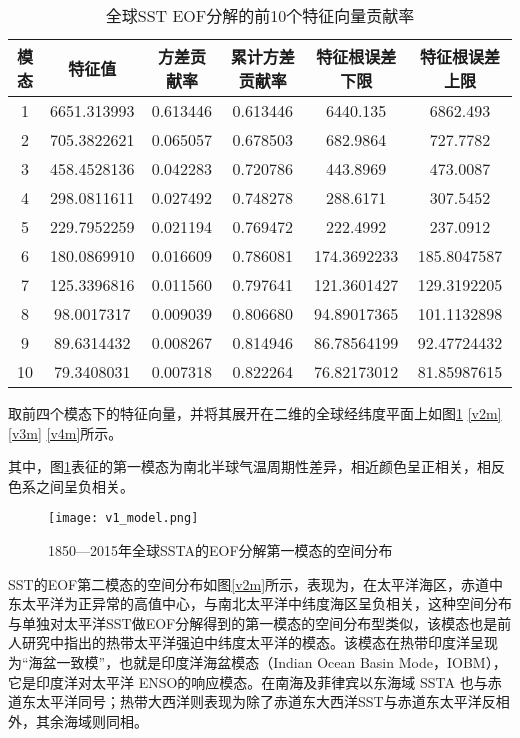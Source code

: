 \documentclass[bwprint]{gmcmthesis}
\begin{document}
\begin{table}[ht]
\centering
\caption{全球SST EOF分解的前10个特征向量贡献率}\label{SST_EOF}%
\begin{tabular}{cccccc}
\toprule  %
模态& 特征值& 方差贡献率& 累计方差贡献率& 特征根误差下限& 特征根误差上限\\
\midrule  %
1& 6651.313993& 0.613446& 0.613446& 6440.135& 6862.493\\
2& 705.3822621& 0.065057& 0.678503& 682.9864& 727.7782\\
3& 458.4528136& 0.042283& 0.720786& 443.8969& 473.0087\\
4& 298.0811611& 0.027492& 0.748278& 288.6171& 307.5452\\
5& 229.7952259& 0.021194& 0.769472& 222.4992& 237.0912\\
6& 180.0869910& 0.016609& 0.786081& 174.3692233& 185.8047587\\
7& 125.3396816& 0.011560& 0.797641& 121.3601427& 129.3192205\\
8& 98.0017317& 	0.009039& 0.806680& 94.89017365& 101.1132898\\
9& 89.6314432& 	0.008267& 0.814946& 86.78564199& 92.47724432\\
10& 79.3408031& 0.007318& 0.822264& 76.82173012& 81.85987615\\
\bottomrule %
\end{tabular}
\end{table}

取前四个模态下的特征向量，并将其展开在二维的全球经纬度平面上如图\ref{v1m} \ref{v2m} \ref{v3m} \ref{v4m}所示。

其中，图\ref{v1m}表征的第一模态为南北半球气温周期性差异\cite{Mochizuki2010Pacific}，相近颜色呈正相关，相反色系之间呈负相关。

\begin{figure}[!h]
\centering
\texttt{[image: v1\_model.png]}
\caption{1850—2015年全球SSTA的EOF分解第一模态的空间分布}\label{v1m}
\end{figure}

SST的EOF第二模态的空间分布如图\ref{v2m}所示，表现为，在太平洋海区，赤道中东太平洋为正异常的高值中心，与南北太平洋中纬度海区呈负相关，这种空间分布与单独对太平洋SST做EOF分解得到的第一模态的空间分布型类似，该模态也是前人研究中指出的热带太平洋强迫中纬度太平洋的模态。该模态在热带印度洋呈现为“海盆一致模”，也就是印度洋海盆模态（Indian Ocean Basin Mode，IOBM），它是印度洋对太平洋 ENSO的响应模态。在南海及菲律宾以东海域 SSTA 也与赤道东太平洋同号；热带大西洋则表现为除了赤道东大西洋SST与赤道东太平洋反相外，其余海域则同相。
\end{document}
